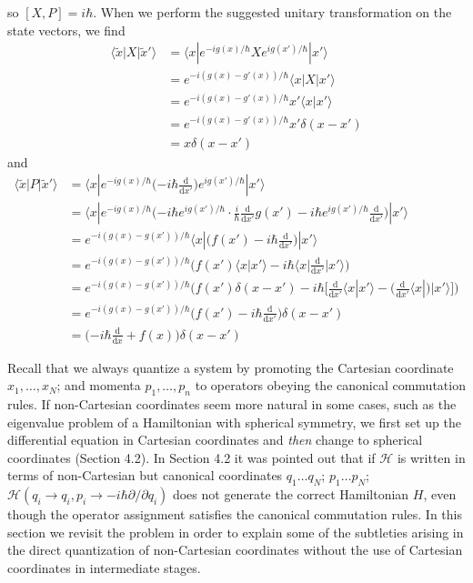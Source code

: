 \documentclass[../principles-of-quantum-mechanics.tex]{subfiles}
\begin{document}
\begin{questions}
\begin{solution}
			so $[X, P] = i\hbar$. When we perform the suggested unitary transformation on the state vectors, we find
			\begin{align*}
				\langle\tilde{x}|X|\tilde{x}'\rangle &= \langle x|e^{-ig(x)/\hbar}Xe^{ig(x')/\hbar}|x'\rangle \\
				&= e^{-i(g(x) - g'(x))/\hbar}\langle x|X|x'\rangle \\
				&= e^{-i(g(x) - g'(x))/\hbar}x'\langle x|x'\rangle \\
				&= e^{-i(g(x) - g'(x))/\hbar}x'\delta(x - x')\\
				&= x\delta(x - x')
			\end{align*}
			and
			\begin{align*}
				\langle\tilde{x}|P|\tilde{x}'\rangle &= \langle x|e^{-ig(x)/\hbar}\Big({-i\hbar\frac{\mathrm{d}}{\mathrm{d}x'}}\Big)e^{ig(x')/\hbar}|x'\rangle \\
				&= \langle x|e^{-ig(x)/\hbar}\Big({-i\hbar} e^{ig(x')/\hbar}\cdot\frac{i}{\hbar}\frac{\mathrm{d}}{\mathrm{d}x'}g(x') - i\hbar e^{ig(x')/\hbar}\frac{\mathrm{d}}{\mathrm{d}x'}\Big)|x'\rangle \\
				&= e^{-i(g(x) - g(x'))/\hbar}\langle x|\Big(f(x') - i\hbar\frac{\mathrm{d}}{\mathrm{d}x'}\Big)|x'\rangle \\
				&= e^{-i(g(x) - g(x'))/\hbar}\Big(f(x')\langle x|x'\rangle - i\hbar\langle x|\frac{\mathrm{d}}{\mathrm{d}x'}|x'\rangle\Big) \\
				&= e^{-i(g(x) - g(x'))/\hbar}\Big(f(x')\delta(x - x') - i\hbar\Big[\frac{\mathrm{d}}{\mathrm{d}x'}\langle x|x'\rangle - \Big(\frac{\mathrm{d}}{\mathrm{d}x'}\langle x|\Big)|x'\rangle\Big]\Big) \\
				&= e^{-i(g(x) - g(x'))/\hbar}\Big(f(x') - i\hbar\frac{\mathrm{d}}{\mathrm{d}x'}\Big)\delta(x - x') \\
				&= \Big({-i\hbar\frac{\mathrm{d}}{\mathrm{d}x}} + f(x)\Big)\delta(x - x')
			\end{align*}
		\end{solution}
		
		\question Recall that we always quantize a system by promoting the Cartesian coordinate $x_1,\ldots, x_N$; and momenta $p_1,\ldots ,p_n$ to operators obeying the canonical commutation rules. If non-Cartesian coordinates seem more natural in some cases, such as the eigenvalue problem of a Hamiltonian with spherical symmetry, we first set up the differential equation in Cartesian coordinates and \textit{then} change to spherical coordinates (Section 4.2). In Section 4.2 it was pointed out that if $\mathcal{H}$ is written in terms of non-Cartesian but canonical coordinates $q_1 \ldots q_N$; $p_1 \ldots p_N$; $\mathcal{H}(q_i \to q_i, p_i \to {-i\hbar\partial/\partial q_i})$ does not generate the correct Hamiltonian $H$, even though the operator assignment satisfies the canonical commutation rules. In this section we revisit the problem in order to explain some of the subtleties arising in the direct quantization of non-Cartesian coordinates without the use of Cartesian coordinates in intermediate stages.
		

\end{questions}
\end{document}
